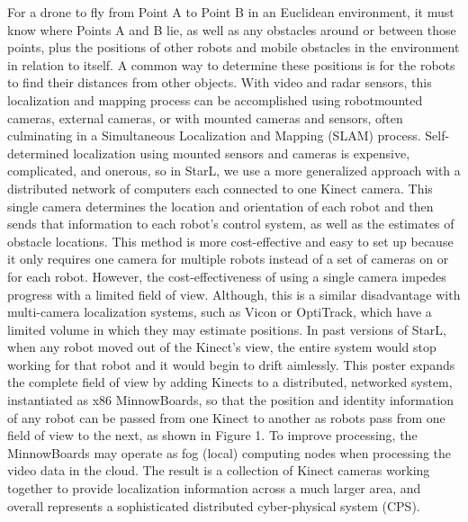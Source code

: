 For a drone to fly from Point A to Point B in an Euclidean environment, it must know where Points A and B lie, as well as any obstacles around or between those points, plus the positions of other robots and mobile obstacles in the environment in relation to itself. A common way to determine these positions is for the robots to find their distances from other objects. With video and radar sensors, this localization and mapping process can be accomplished using robotmounted cameras, external cameras, or with mounted cameras and sensors, often culminating in a Simultaneous Localization and Mapping (SLAM) process. Self-determined localization using mounted sensors and cameras is expensive, complicated, and onerous, so in StarL, we use a more generalized approach with a distributed network of computers each connected to one Kinect camera. This single camera determines the location and orientation of each robot and then sends that information to each robot’s control system, as well as the estimates of obstacle locations. This method is more cost-effective and easy to set up because it only requires one camera for multiple robots instead of a set of cameras on or for each robot. However, the cost-effectiveness of using a single camera impedes progress with a limited field of view. Although, this is a similar disadvantage with multi-camera localization systems, such as Vicon or OptiTrack, which have a limited volume in which they may estimate positions. In past versions of StarL, when any robot moved out of the Kinect’s view, the entire system would stop working for that robot and it would begin to drift aimlessly. This poster expands the complete field of view by adding Kinects to a distributed, networked system, instantiated as x86 MinnowBoards, so that the position and identity information of any robot can be passed from one Kinect to another as robots pass from one field of view to the next, as shown in Figure 1. To improve processing, the MinnowBoards may operate as fog (local) computing nodes when processing the video data in the cloud. The result is a collection of Kinect cameras working together to provide localization information across a much larger area, and overall represents a sophisticated distributed cyber-physical system (CPS).